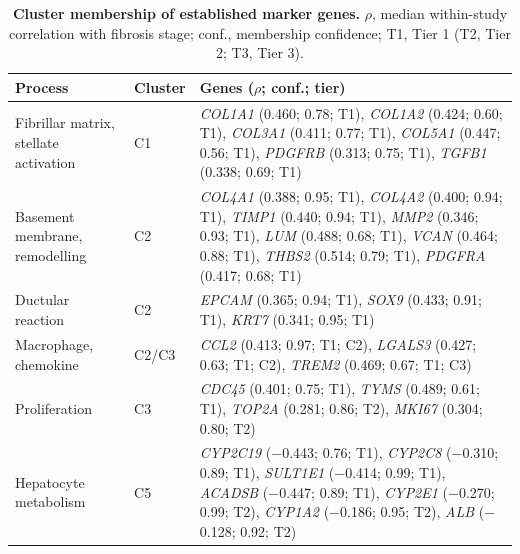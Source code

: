 \documentclass[11pt,a4paper]{article}
\begin{document}
\begin{table}[!t]\centering
\caption{\textbf{Cluster membership of established marker genes.} $\rho$, median within-study correlation with fibrosis stage; conf., membership confidence; T1, Tier 1 (T2, Tier 2; T3, Tier 3).}\label{tab:markers}
\small\setlength{\tabcolsep}{4pt}\renewcommand{\arraystretch}{1.18}
\begin{tabularx}{\linewidth}{l l X}
\toprule
\rowcolor{white}\textbf{Process} & \textbf{Cluster} & \textbf{Genes ($\rho$; conf.; tier)} \\
\midrule
Fibrillar matrix, stellate activation & C1 & \textit{COL1A1} (0.460; 0.78; T1), \textit{COL1A2} (0.424; 0.60; T1), \textit{COL3A1} (0.411; 0.77; T1), \textit{COL5A1} (0.447; 0.56; T1), \textit{PDGFRB} (0.313; 0.75; T1), \textit{TGFB1} (0.338; 0.69; T1) \\
Basement membrane, remodelling & C2 & \textit{COL4A1} (0.388; 0.95; T1), \textit{COL4A2} (0.400; 0.94; T1), \textit{TIMP1} (0.440; 0.94; T1), \textit{MMP2} (0.346; 0.93; T1), \textit{LUM} (0.488; 0.68; T1), \textit{VCAN} (0.464; 0.88; T1), \textit{THBS2} (0.514; 0.79; T1), \textit{PDGFRA} (0.417; 0.68; T1) \\
Ductular reaction & C2 & \textit{EPCAM} (0.365; 0.94; T1), \textit{SOX9} (0.433; 0.91; T1), \textit{KRT7} (0.341; 0.95; T1) \\
Macrophage, chemokine & C2/C3 & \textit{CCL2} (0.413; 0.97; T1; C2), \textit{LGALS3} (0.427; 0.63; T1; C2), \textit{TREM2} (0.469; 0.67; T1; C3) \\
Proliferation & C3 & \textit{CDC45} (0.401; 0.75; T1), \textit{TYMS} (0.489; 0.61; T1), \textit{TOP2A} (0.281; 0.86; T2), \textit{MKI67} (0.304; 0.80; T2) \\
Hepatocyte metabolism & C5 & \textit{CYP2C19} ($-$0.443; 0.76; T1), \textit{CYP2C8} ($-$0.310; 0.89; T1), \textit{SULT1E1} ($-$0.414; 0.99; T1), \textit{ACADSB} ($-$0.447; 0.89; T1), \textit{CYP2E1} ($-$0.270; 0.99; T2), \textit{CYP1A2} ($-$0.186; 0.95; T2), \textit{ALB} ($-$0.128; 0.92; T2) \\
\bottomrule
\end{tabularx}
\end{table}
\end{document}
